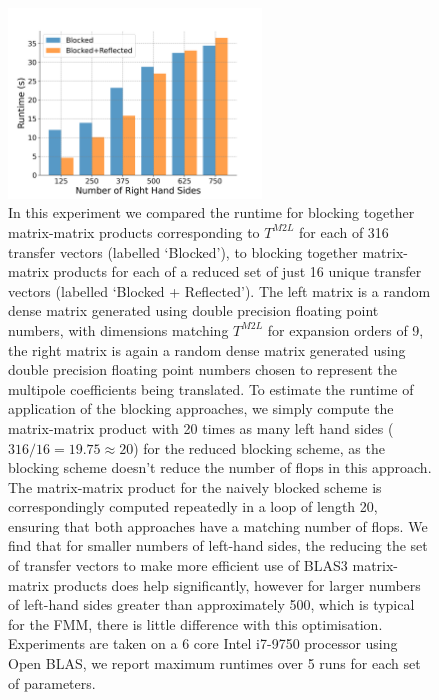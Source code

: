 \begin{figure}
    \centering
    \includegraphics[width=0.6\textwidth]{images/ch_3/blas3.png}
    \caption{In this experiment we compared the runtime for blocking together matrix-matrix products corresponding to $T^{M2L}$ for each of 316 transfer vectors (labelled `Blocked'), to blocking together matrix-matrix products for each of a reduced set of just 16 unique transfer vectors (labelled `Blocked + Reflected'). The left matrix is a random dense matrix generated using double precision floating point numbers, with dimensions matching $T^{M2L}$ for expansion orders of 9, the right matrix is again a random dense matrix generated using double precision floating point numbers chosen to represent the multipole coefficients being translated. To estimate the runtime of application of the blocking approaches, we simply compute the matrix-matrix product with 20 times as many left hand sides ($316/16 = 19.75 \approx 20$) for the reduced blocking scheme, as the blocking scheme doesn't reduce the number of flops in this approach. The matrix-matrix product for the naively blocked scheme is correspondingly computed repeatedly in a loop of length 20, ensuring that both approaches have a matching number of flops. We find that for smaller numbers of left-hand sides, the reducing the set of transfer vectors to make more efficient use of BLAS3 matrix-matrix products does help significantly, however for larger numbers of left-hand sides greater than approximately 500, which is typical for the FMM, there is little difference with this optimisation. Experiments are taken on a 6 core Intel i7-9750 processor using Open BLAS, we report maximum runtimes over 5 runs for each set of parameters.}
    \label{fig:chpt:3:sec:1:subsec:2:blas3}
\end{figure}

